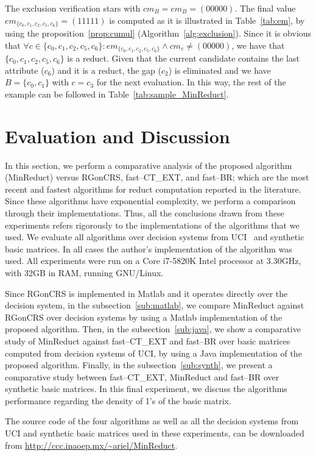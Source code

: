 \documentclass[authoryear,preprint,review,12pt]{elsarticle}
\begin{document}
	The exclusion verification stars with $cm_B = em_B = (00000)$. The final value $em_{\lbrace c_0,c_1,c_2,c_5,c_6\rbrace}=(11111)$ is computed as it is illustrated in Table~\ref{tab:em}, by using the proposition~\ref{prop:cumul} (Algorithm~\ref{alg:exclusion}). Since it is obvious that $\forall c \in \lbrace c_0,c_1,c_2,c_5,c_6\rbrace : em_{\lbrace c_0,c_1,c_2,c_5,c_6\rbrace}\wedge cm_c \neq (00000)$, we have that $\lbrace c_0,c_1,c_2,c_5,c_6\rbrace$ is a reduct. Given that the current candidate contains the last attribute ($c_6$) and it is a reduct, the gap ($c_2$) is eliminated and we have $B = \lbrace c_0,c_1\rbrace$ with $c=c_3$ for the next evaluation. In this way, the rest of the example can be followed in Table~\ref{tab:sample_MinReduct}.

	
%
\section{Evaluation and Discussion}\label{evaluation}
	In this section, we perform a comparative analysis of the proposed algorithm (MinReduct) versus RGonCRS, fast--CT\_EXT, and fast--BR; which are the most recent and fastest algorithms for reduct computation reported in the literature. Since these algorithms have exponential complexity, we perform a comparison through their implementations. Thus, all the conclusions drawn from these experiments refers rigorously to the implementations of the algorithms that we used. We evaluate all algorithms over decision systems from UCI~\cite{Bache13} and synthetic basic matrices. In all cases the author's implementation of the algorithm was used. All experiments were run on a Core i7-5820K Intel processor at 3.30GHz, with 32GB in RAM, running GNU/Linux.
	
	Since RGonCRS is implemented in Matlab and it operates directly	over the decision system, in the subsection~\ref{sub:matlab}, we compare MinReduct against RGonCRS over decision systems by using a Matlab implementation of the proposed algorithm. Then, in the subsection~\ref{sub:java}, we show a comparative study of MinReduct against fast--CT\_EXT and fast--BR over basic matrices computed from decision systems of UCI, by using a Java implementation of the proposed algorithm. Finally, in the subsection~\ref{sub:synth}, we present a comparative study between fast--CT\_EXT, MinReduct and fast--BR over synthetic basic matrices. In this final experiment, we discuss the algorithms performance regarding the density of 1's of the basic matrix. 
	
	The source code of the four algorithms as well as all the decision systems from UCI and synthetic basic matrices used in these experiments, can be downloaded from \url{http://ccc.inaoep.mx/~ariel/MinReduct}.
	
\end{document}
